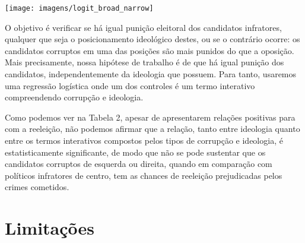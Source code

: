 \documentclass[
	12pt,				%
	openright,			%
	twoside,			%
	a4paper,			%
	openany,
	english,			%
	brazil				%
	]{abntex2}
\begin{document}

\begin{center}
	\centering
	\hfill\texttt{[image: imagens/logit\_broad\_narrow]}\hspace{\fill}
	\label{fig:logitbroadnarrow}
\end{center}

\newpage

O objetivo é verificar se há igual punição eleitoral dos candidatos infratores, qualquer que seja o posicionamento ideológico destes, ou se o contrário ocorre: os candidatos corruptos em uma das posições são mais punidos do que a oposição. Mais precisamente, nossa hipótese de trabalho é de que há igual punição dos candidatos, independentemente da ideologia que possuem. Para tanto, usaremos uma regressão logística onde um dos controles é um termo interativo compreendendo corrupção e ideologia. %

Como podemos ver na Tabela 2, apesar de apresentarem relações positivas para com a reeleição, não podemos afirmar que a relação, tanto entre ideologia quanto entre os termos interativos compostos pelos tipos de corrupção e ideologia, é estatisticamente significante, de modo que não se pode sustentar que os candidatos corruptos de esquerda ou direita, quando em comparação com políticos infratores de centro, tem as chances de reeleição prejudicadas pelos crimes cometidos.


	

			

\section{Limitações}
\end{document}
